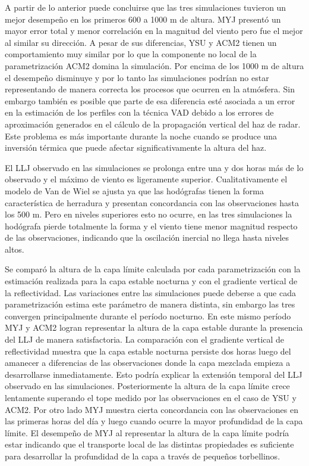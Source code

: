 \documentclass[12pt,spanish,oneside, a4paper]{book}
\begin{document}
A partir de lo anterior puede concluirse que las tres simulaciones
tuvieron un mejor desempeño en los primeros 600 a 1000 m de altura. MYJ
presentó un mayor error total y menor correlación en la magnitud del
viento pero fue el mejor al similar su dirección. A pesar de sus
diferencias, YSU y ACM2 tienen un comportamiento muy similar por lo que
la componente no local de la parametrización ACM2 domina la simulación.
Por encima de los 1000 m de altura el desempeño disminuye y por lo tanto
las simulaciones podrían no estar representando de manera correcta los
procesos que ocurren en la atmósfera. Sin embargo también es posible que
parte de esa diferencia esté asociada a un error en la estimación de los
perfiles con la técnica VAD debido a los errores de aproximación
generados en el cálculo de la propagación vertical del haz de radar.
Este problema es más importante durante la noche cuando se produce una
inversión térmica que puede afectar significativamente la altura del
haz.

El LLJ observado en las simulaciones se prolonga entre una y dos horas
más de lo observado y el máximo de viento es ligeramente superior.
Cualitativamente el modelo de Van de Wiel se ajusta ya que las
hodógrafas tienen la forma característica de herradura y presentan
concordancia con las observaciones hasta los 500 m. Pero en niveles
superiores esto no ocurre, en las tres simulaciones la hodógrafa pierde
totalmente la forma y el viento tiene menor magnitud respecto de las
observaciones, indicando que la oscilación inercial no llega hasta
niveles altos.

Se comparó la altura de la capa límite calculada por cada
parametrización con la estimación realizada para la capa estable
nocturna y con el gradiente vertical de la reflectividad. Las
variaciones entre las simulaciones puede deberse a que cada
parametrización estima este parámetro de manera distinta, sin embargo
las tres convergen principalmente durante el período nocturno. En este
mismo período MYJ y ACM2 logran representar la altura de la capa estable
durante la presencia del LLJ de manera satisfactoria. La comparación con
el gradiente vertical de reflectividad muestra que la capa estable
nocturna persiste dos horas luego del amanecer a diferencias de las
observaciones donde la capa mezclada empieza a desarrollarse
inmediatamente. Esto podría explicar la extensión temporal del LLJ
observado en las simulaciones. Posteriormente la altura de la capa
límite crece lentamente superando el tope medido por las observaciones
en el caso de YSU y ACM2. Por otro lado MYJ muestra cierta concordancia
con las observaciones en las primeras horas del día y luego cuando
ocurre la mayor profundidad de la capa límite. El desempeño de MYJ al
representar la altura de la capa límite podría estar indicando que el
transporte local de las distintas propiedades es suficiente para
desarrollar la profundidad de la capa a través de pequeños torbellinos.
\end{document}
